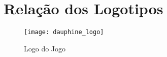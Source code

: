 \AddToShipoutPicture{\BackgroundPic}

\section*{Relação dos Logotipos}
\begin{figure}[htb]
			\centering
			\texttt{[image: dauphine\_logo]}
			\caption{Logo do Jogo}
		\end{figure}

